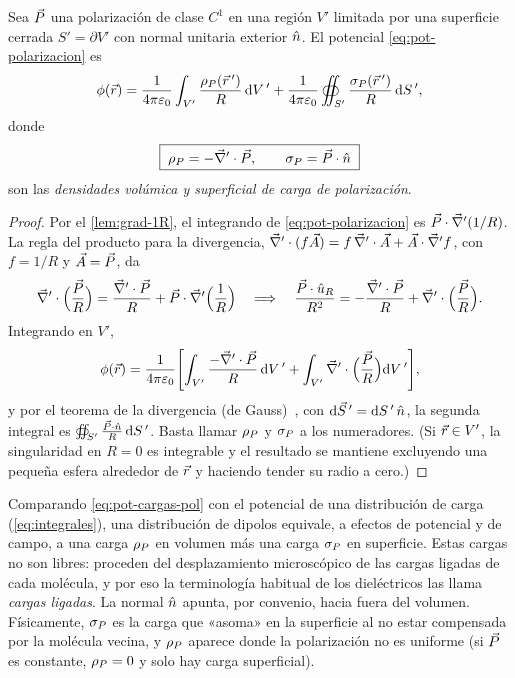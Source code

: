 \begin{teorema}\label{teo:cargas-pol}
Sea $\vec{P}$ una polarización de clase $C^{1}$ en una región $V'$ limitada por una superficie cerrada $S'=\partial V'$ con normal unitaria exterior
$\hat{n}$. El potencial \cref{eq:pot-polarizacion} es
\begin{equation}\label{eq:pot-cargas-pol}
  \phi(\vec{r})=\frac{1}{4\pi\varepsilon_{0}}\int_{V'}\frac{\rho_{P}(\vec{r}\,')}{R}\,\mathrm{d} V\,'+\frac{1}{4\pi\varepsilon_{0}}\oiint_{S'}\frac{\sigma_{P}(\vec{r}\,')}{R}\,\mathrm{d} S\,',
\end{equation}
donde
\begin{equation}\label{eq:densidades-pol}
  \boxed{\;\rho_{P}=-\vec{\nabla}'\cdot\vec{P},\qquad \sigma_{P}=\vec{P}\cdot\hat{n}\;}
\end{equation}
son las \emph{densidades volúmica y superficial de carga de polarización}.
\end{teorema}
\begin{proof}
Por el \cref{lem:grad-1R}, el integrando de \cref{eq:pot-polarizacion} es $\vec{P}\cdot\vec{\nabla}'(1/R)$. La regla del producto para la divergencia,
$\vec{\nabla}'\cdot(f\vec{A})=f\,\vec{\nabla}'\cdot\vec{A}+\vec{A}\cdot\vec{\nabla}' f$, con $f=1/R$ y $\vec{A}=\vec{P}$, da
\[
  \vec{\nabla}'\cdot\Bigl(\frac{\vec{P}}{R}\Bigr)=\frac{\vec{\nabla}'\cdot\vec{P}}{R}+\vec{P}\cdot\vec{\nabla}'\Bigl(\frac{1}{R}\Bigr)
  \quad\Longrightarrow\quad
  \frac{\vec{P}\cdot\hat{u}_{R}}{R^{2}}=-\frac{\vec{\nabla}'\cdot\vec{P}}{R}+\vec{\nabla}'\cdot\Bigl(\frac{\vec{P}}{R}\Bigr).
\]
Integrando en $V'$,
\[
  \phi(\vec{r})=\frac{1}{4\pi\varepsilon_{0}}\Biggl[\int_{V'}\frac{-\vec{\nabla}'\cdot\vec{P}}{R}\,\mathrm{d} V\,'+\int_{V'}\vec{\nabla}'\cdot\Bigl(\frac{\vec{P}}{R}\Bigr)\mathrm{d} V\,'\Biggr],
\]
y por el teorema de la divergencia (de Gauss)~\cite{TEMA0}, con $\mathrm{d}\vec{S}\,'=\mathrm{d} S\,'\,\hat{n}$, la segunda integral es
$\oiint_{S'}\frac{\vec{P}\cdot\hat{n}}{R}\,\mathrm{d} S\,'$. Basta llamar $\rho_{P}$ y $\sigma_{P}$ a los numeradores. (Si $\vec{r}\in V'$, la singularidad en $R=0$ es integrable y
el resultado se mantiene excluyendo una pequeña esfera alrededor de $\vec{r}$ y haciendo tender su radio a cero.)
\end{proof}

\begin{observacion}\label{obs:ligadas}
Comparando \cref{eq:pot-cargas-pol} con el potencial de una distribución de carga (\cref{eq:integrales}), una distribución de dipolos equivale, a efectos de
potencial y de campo, a una carga $\rho_{P}$ en volumen más una carga $\sigma_{P}$ en superficie. Estas cargas no son libres: proceden del desplazamiento
microscópico de las cargas ligadas de cada molécula, y por eso la terminología habitual de los dieléctricos las llama \emph{cargas ligadas}. La normal
$\hat{n}$ apunta, por convenio, hacia fuera del volumen. Físicamente, $\sigma_{P}$ es la carga que «asoma» en la superficie al no estar compensada por la
molécula vecina, y $\rho_{P}$ aparece donde la polarización no es uniforme (si $\vec{P}$ es constante, $\rho_{P}=0$ y solo hay carga superficial).
\end{observacion}

